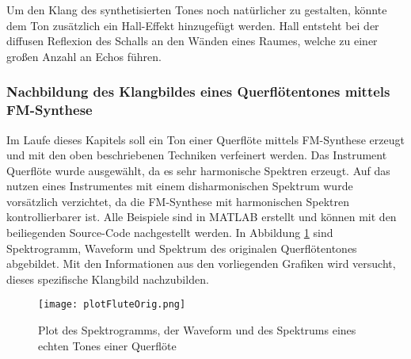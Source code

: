 Um den Klang des synthetisierten Tones noch natürlicher zu gestalten, könnte dem Ton zusätzlich ein Hall-Effekt hinzugefügt werden. Hall entsteht bei der diffusen Reflexion des Schalls an den Wänden eines Raumes, welche zu einer großen Anzahl an Echos führen. \cite[S. 108]{stotz}


\FloatBarrier
\subsubsection{Nachbildung des Klangbildes eines Querflötentones mittels FM-Synthese}

Im Laufe dieses Kapitels soll ein Ton einer Querflöte mittels FM-Synthese erzeugt und mit den oben beschriebenen Techniken verfeinert werden. Das Instrument Querflöte wurde ausgewählt, da es sehr harmonische Spektren erzeugt. Auf das nutzen eines Instrumentes mit einem disharmonischen Spektrum wurde vorsätzlich verzichtet, da die FM-Synthese mit harmonischen Spektren kontrollierbarer ist. Alle Beispiele sind in MATLAB erstellt und können mit den beiliegenden Source-Code nachgestellt werden. In Abbildung \ref{fig:plotFluteOrig} sind Spektrogramm, Waveform und Spektrum des originalen Querflötentones abgebildet. Mit den Informationen aus den vorliegenden Grafiken wird versucht, dieses spezifische Klangbild nachzubilden.

\begin{figure} [h!t!b!]
\centering
  \texttt{[image: plotFluteOrig.png]}
\caption{Plot des Spektrogramms, der Waveform und des Spektrums eines echten Tones einer Querflöte}
\label{fig:plotFluteOrig}
\end{figure}

